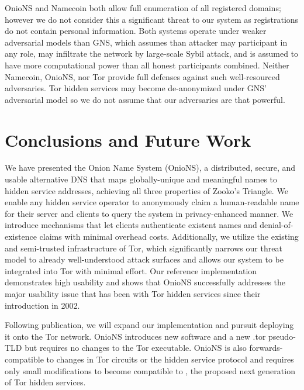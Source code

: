 \documentclass[USenglish,oneside,twocolumn]{article}
\begin{document}
OnioNS and Namecoin both allow full enumeration of all registered domains; however we do not consider this a significant threat to our system as registrations do not contain personal information. Both systems operate under weaker adversarial models than GNS, which assumes than attacker may participant in any role, may infiltrate the network by large-scale Sybil attack, and is assumed to have more computational power than all honest participants combined. Neither Namecoin, OnioNS, nor Tor provide full defenses against such well-resourced adversaries. Tor hidden services may become de-anonymized under GNS' adversarial model so we do not assume that our adversaries are that powerful. %

\section{Conclusions and Future Work}

We have presented the Onion Name System (OnioNS), a distributed, secure, and usable alternative DNS that maps globally-unique and meaningful names to hidden service addresses, achieving all three properties of Zooko's Triangle. We enable any hidden service operator to anonymously claim a human-readable name for their server and clients to query the system in privacy-enhanced manner. We introduce mechanisms that let clients authenticate existent names and denial-of-existence claims with minimal overhead costs. Additionally, we utilize the existing and semi-trusted infrastructure of Tor, which significantly narrows our threat model to already well-understood attack surfaces and allows our system to be integrated into Tor with minimal effort. Our reference implementation demonstrates high usability and shows that OnioNS successfully addresses the major usability issue that has been with Tor hidden services since their introduction in 2002.

Following publication, we will expand our implementation and pursuit deploying it onto the Tor network. OnioNS introduces new software and a new .tor pseudo-TLD but requires no changes to the Tor executable. OnioNS is also forwards-compatible to changes in Tor circuits or the hidden service protocol and requires only small modifications to become compatible to \cite{TorProp224}, the proposed next generation of Tor hidden services.

\end{document}
